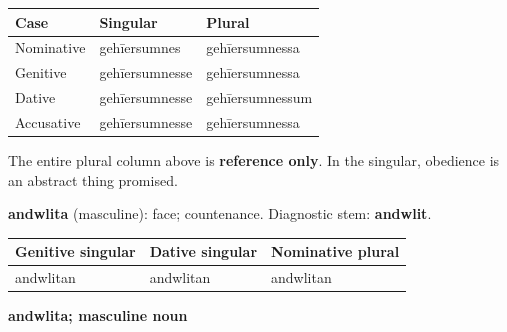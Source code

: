 \par\begingroup
\fontsize{10.5}{13.2}\selectfont
\setlength{\LTleft}{0pt}\setlength{\LTright}{\fill}
\noindent
\begin{tabular}{@{}>{\raggedright\arraybackslash}p{30.35mm}>{\raggedright\arraybackslash}p{42.49mm}>{\raggedright\arraybackslash}p{45.53mm}@{}}
\toprule
\textbf{Case} & \textbf{Singular} & \textbf{Plural} \\
\midrule
Nominative & gehīersumnes & gehīersumnessa \\
Genitive & gehīersumnesse & gehīersumnessa \\
Dative & gehīersumnesse & gehīersumnessum \\
Accusative & gehīersumnesse & gehīersumnessa \\
\bottomrule
\end{tabular}
\par\endgroup

The entire plural column above is \textbf{reference only}. In the singular, obedience is an abstract thing promised.

\textbf{andwlita} (masculine): face; countenance. Diagnostic stem: \textbf{andwlit}.

\par\begingroup
\fontsize{10.5}{13.2}\selectfont
\setlength{\LTleft}{0pt}\setlength{\LTright}{\fill}
\noindent
\begin{tabular}{@{}>{\raggedright\arraybackslash}p{39.83mm}>{\raggedright\arraybackslash}p{36.98mm}>{\raggedright\arraybackslash}p{41.57mm}@{}}
\toprule
\textbf{Genitive singular} & \textbf{Dative singular} & \textbf{Nominative plural} \\
\midrule
andwlitan & andwlitan & andwlitan \\
\bottomrule
\end{tabular}
\par\endgroup

\textbf{andwlita; masculine noun}

